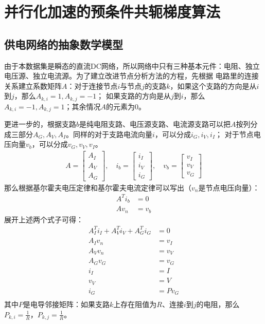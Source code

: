 \chapter{并行化加速的预条件共轭梯度算法}
\label{cha:algo}

\section{供电网络的抽象数学模型}

由于本数据集是瞬态的直流DC网络，所以网络中只有三种基本元件：电阻、独立电压源、独立电流源。为了建立改进节点分析方法的方程，先根据
电路里的连接关系建立系数矩阵$A$：对于连接节点$i$与节点$j$的支路$k$，如果这个支路的方向是从$i$到$j$，那么$A_{k,i}=1, A_{k,j}=-1$；
如果支路的方向是从$j$到$i$，那么$A_{k,i}=-1, A_{k,j}=1$；其余情况$A$的元素为0。

更进一步的，根据支路$b$是纯电阻支路、电压源支路、电流源支路可以把$A$按列分成三部分$A_G,A_V,A_I$。同样的对于支路电流向量$i$，可以分成$i_G,i_V,i_I$；
对于节点电压向量$v_b$，可以分成$v_G,v_V,v_I$。
\begin{align}
A=\begin{bmatrix} A_I \\ A_V \\ A_G \end{bmatrix}, \quad
i_b=\begin{bmatrix} i_I \\ i_V \\ i_G \end{bmatrix},\quad
v_b=\begin{bmatrix} v_I \\ v_V \\ v_G \end{bmatrix}
\end{align}
那么根据基尔霍夫电压定律和基尔霍夫电流定律可以写出（$v_n$是节点电压向量）：
\begin{align}
A^T i_b & =  0 \\
A v_n & = v_b
\end{align}
展开上述两个式子可得：
\begin{align*}
A_I^T i_I + A_V^T i_V + A_G^T i_G & = 0 \\
A_I v_n & = v_I \\
A_V v_n & = v_V \\
A_G v_G & = v_G \\
i_I & = I \\
v_V & = V \\
i_G & = P v_G \\
\end{align*}
其中$P$是电导邻接矩阵：如果支路$k$上存在阻值为$R$、连接$i$到$j$的电阻，那么$P_{k,i}=\frac{1}{R}$，$P_{k,j}=\frac{1}{R}$。

